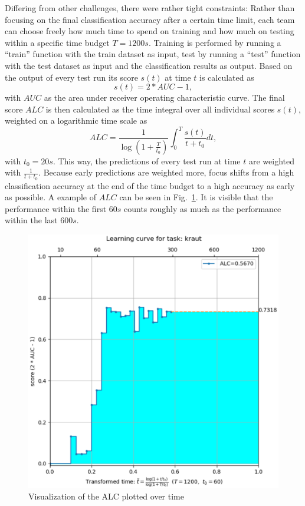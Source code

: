 \documentclass{article}
\begin{document}
Differing from other challenges, there were rather tight constraints: Rather than focusing on the final classification accuracy after a certain time limit, each team can choose freely how much time to spend on training and how much on testing within a specific time budget $T=1200s$. Training is performed by running a ``train'' function with the train dataset as input, test by running a ``test'' function with the test dataset as input and the classification results as output. Based on the output of every test run its score $s(t)$ at time $t$ is calculated as 
%
\begin{equation}
s(t) = 2*AUC - 1, \nonumber
\end{equation} 
%
with $AUC$ as the area under receiver operating characteristic curve. The final score $ALC$ is then calculated as the time integral over all individual scores $s(t)$, weighted on a logarithmic time scale as
%
\begin{equation}
ALC = \frac{1}{\log \left( 1 + \frac{T}{t_0} \right)} \int_0^T \frac{s(t)}{t+t_0} dt, \nonumber
\end{equation} 
%
with $t_0=20s$. This way, the predictions of every test run at time $t$ are weighted with $\frac{1}{t+t_0}$. Because early predictions are weighted more, focus shifts from a high classification accuracy at the end of the time budget to a high accuracy as early as possible. A example of $ALC$ can be seen in Fig.~\ref{fig:learningCurveExample}. It is visible that the performance within the first $60s$ counts roughly as much as the performance within the last $600s$.
%
\begin{figure}[htb]
\begin{center}
 	\includegraphics[width=0.95\linewidth]{../figures/learning-curve-example.eps} 
\end{center}
\caption{Visualization of the ALC plotted over time}
\label{fig:learningCurveExample}
\end{figure} 
%
\end{document}
